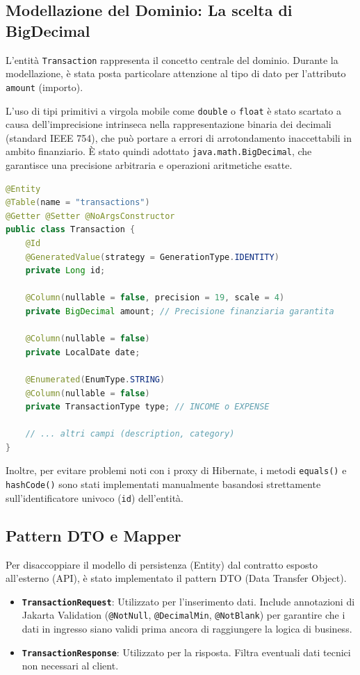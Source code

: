 \subsection{Modellazione del Dominio: La scelta di BigDecimal}
L'entità \texttt{Transaction} rappresenta il concetto centrale del dominio. Durante la modellazione, è stata posta particolare attenzione al tipo di dato per l'attributo \texttt{amount} (importo).

L'uso di tipi primitivi a virgola mobile come \texttt{double} o \texttt{float} è stato scartato a causa dell'imprecisione intrinseca nella rappresentazione binaria dei decimali (standard IEEE 754), che può portare a errori di arrotondamento inaccettabili in ambito finanziario.
È stato quindi adottato \texttt{java.math.BigDecimal}, che garantisce una precisione arbitraria e operazioni aritmetiche esatte.

\bigskip

\begin{lstlisting}[language=Java, label={lst:transactionentity}]
@Entity
@Table(name = "transactions")
@Getter @Setter @NoArgsConstructor
public class Transaction {
    @Id
    @GeneratedValue(strategy = GenerationType.IDENTITY)
    private Long id;

    @Column(nullable = false, precision = 19, scale = 4)
    private BigDecimal amount; // Precisione finanziaria garantita

    @Column(nullable = false)
    private LocalDate date;

    @Enumerated(EnumType.STRING)
    @Column(nullable = false)
    private TransactionType type; // INCOME o EXPENSE
    
    // ... altri campi (description, category)
}
\end{lstlisting}

Inoltre, per evitare problemi noti con i proxy di Hibernate, i metodi \texttt{equals()} e \texttt{hashCode()} sono stati implementati manualmente basandosi strettamente sull'identificatore univoco (\texttt{id}) dell'entità.

\subsection{Pattern DTO e Mapper}
Per disaccoppiare il modello di persistenza (Entity) dal contratto esposto all'esterno (API), è stato implementato il pattern DTO (Data Transfer Object).

\begin{itemize}
    \item \textbf{\texttt{TransactionRequest}}: Utilizzato per l'inserimento dati. Include annotazioni di Jakarta Validation (\texttt{@NotNull}, \texttt{@DecimalMin}, \texttt{@NotBlank}) per garantire che i dati in ingresso siano validi prima ancora di raggiungere la logica di business.
    \item \textbf{\texttt{TransactionResponse}}: Utilizzato per la risposta. Filtra eventuali dati tecnici non necessari al client.
\end{itemize}

